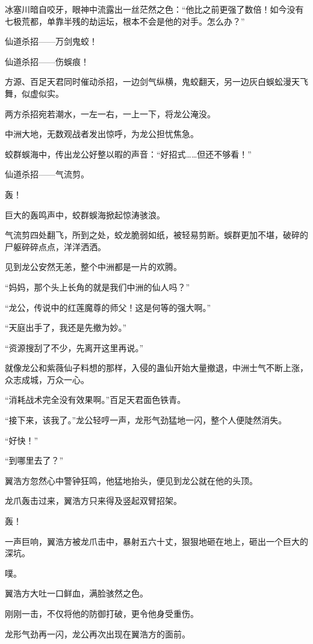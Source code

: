 \begin{this_body}
冰塞川暗自咬牙，眼神中流露出一丝茫然之色：“他比之前更强了数倍！如今没有七极荒都，单靠半残的劫运坛，根本不会是他的对手。怎么办？”

仙道杀招——万剑鬼蛟！

仙道杀招——伤蜈痕！

方源、百足天君同时催动杀招，一边剑气纵横，鬼蛟翻天，另一边灰白蜈蚣漫天飞舞，似虚似实。

两方杀招宛若潮水，一左一右，一上一下，将龙公淹没。

中洲大地，无数观战者发出惊呼，为龙公担忧焦急。

蛟群蜈海中，传出龙公好整以暇的声音：“好招式……但还不够看！”

仙道杀招——气流剪。

轰！

巨大的轰鸣声中，蛟群蜈海掀起惊涛骇浪。

气流剪四处翻飞，所到之处，蛟龙脆弱如纸，被轻易剪断。蜈群更加不堪，破碎的尸躯碎碎点点，洋洋洒洒。

见到龙公安然无恙，整个中洲都是一片的欢腾。

“妈妈，那个头上长角的就是我们中洲的仙人吗？”

“龙公，传说中的红莲魔尊的师父！这是何等的强大啊。”

“天庭出手了，我还是先撤为妙。”

“资源搜刮了不少，先离开这里再说。”

就像龙公和紫薇仙子料想的那样，入侵的蛊仙开始大量撤退，中洲士气不断上涨，众志成城，万众一心。

“消耗战术完全没有效果啊。”百足天君面色铁青。

“接下来，该我了。”龙公轻哼一声，龙形气劲猛地一闪，整个人便陡然消失。

“好快！”

“到哪里去了？”

翼浩方忽然心中警钟狂鸣，他猛地抬头，便见到龙公就在他的头顶。

龙爪轰击过来，翼浩方只来得及竖起双臂招架。

轰！

一声巨响，翼浩方被龙爪击中，暴射五六十丈，狠狠地砸在地上，砸出一个巨大的深坑。

噗。

翼浩方大吐一口鲜血，满脸骇然之色。

刚刚一击，不仅将他的防御打破，更令他身受重伤。

龙形气劲再一闪，龙公再次出现在翼浩方的面前。


\end{this_body}

